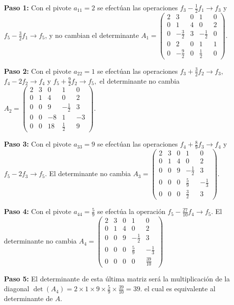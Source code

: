 \begin{myproof} \textbf{Paso 1:} Con el pivote \(a_{11} = 2\) se efectúan las operaciones \(f_3 - \frac{1}{2}f_1 \to f_3\)  y  \( f_5 - \frac{3}{2}f_1\to f_5\), y no cambian el determinante
\(
A_1 = \begin{pmatrix}
2 & 3 & 0 & 1 & 0 \\
0 & 1 & 4 & 0 & 2 \\
0 & -\frac{3}{2} & 3 & -\frac{1}{2} & 0 \\
0 & 2 & 0 & 1 & 1 \\
0 & -\frac{9}{2} & 0 & \frac{1}{2} & 0
\end{pmatrix}.\)

\textbf{Paso 2:} Con el pivote \(a_{22} = 1\) se efectúan las operaciones \(f_3 + \frac{3}{2}f_2 \to f_3,\) \(f_4 - 2f_2\to f_4\) y \(f_5 + \frac{9}{2}f_2 \to f_5,\) el determinante no cambia \(
A_2 = \begin{pmatrix}
2 & 3 & 0 & 1 & 0 \\
0 & 1 & 4 & 0 & 2 \\
0 & 0 & 9 & -\frac{1}{2} & 3 \\
0 & 0 & -8 & 1 & -3 \\
0 & 0 & 18 & \frac{1}{2} & 9
\end{pmatrix}.\)

\textbf{Paso 3:} Con el pivote \(a_{33} = 9\) se efectúan las operaciones \(f_4 + \frac{8}{9}f_3 \to f_4\) y \(f_5 - 2f_3\to f_5.\) El determinante no cambia \(
A_3 = \begin{pmatrix}
2 & 3 & 0 & 1 & 0 \\
0 & 1 & 4 & 0 & 2 \\
0 & 0 & 9 & -\frac{1}{2} & 3 \\
0 & 0 & 0 & \frac{5}{9} & -\frac{1}{3} \\
0 & 0 & 0 & \frac{3}{2} & 3
\end{pmatrix}.\)

\textbf{Paso 4:} Con el pivote \(a_{44} = \frac{5}{9}\) se efectúa la operación \(f_5 - \frac{27}{10}f_4 \to f_5.\) El determinante no cambia \(
A_4 = \begin{pmatrix}
2 & 3 & 0 & 1 & 0 \\
0 & 1 & 4 & 0 & 2 \\
0 & 0 & 9 & -\frac{1}{2} & 3 \\
0 & 0 & 0 & \frac{5}{9} & -\frac{1}{3} \\
0 & 0 & 0 & 0 & \frac{39}{10}
\end{pmatrix}\)

\textbf{Paso 5:} El determinante de esta última matriz será la multiplicación de la diagonal $\det(A_4)=2\times 1\times 9\times \frac{5}{9}\times \frac{39}{10}=39.$ el cual es equivalente al determinante de $A.$
\end{myproof}


